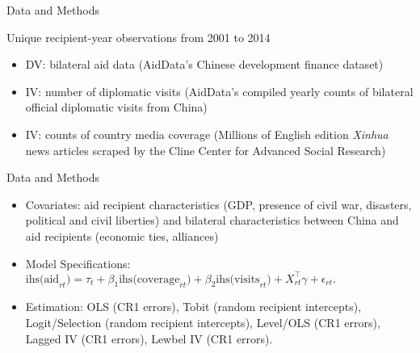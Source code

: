 \documentclass{beamer}
\begin{document}


\begin{frame}{Data and Methods}

Unique recipient-year observations from 2001 to 2014

\begin{itemize} 

\item DV: bilateral aid data (AidData’s Chinese development finance dataset)

\item IV: number of diplomatic visits (AidData’s compiled yearly counts of bilateral official
diplomatic visits from China)

\item IV: counts of country media coverage (Millions of English edition \textit{Xinhua} news articles scraped by the Cline Center for Advanced Social Research)


\end{itemize}

\end{frame}


\begin{frame}{Data and Methods}

\begin{itemize} 

\item Covariates: aid recipient characteristics (GDP, presence of civil war, disasters, political and civil liberties) and bilateral characteristics between China and aid recipients (economic ties, alliances)

\item Model Specifications: $\text{ihs(aid}_{rt}) = \tau_t + \beta_1\text{ihs(coverage}_{rt}) + \beta_2\text{ihs(visits}_{rt}) + X_{rt}^\top \gamma + \epsilon_{rt}.$

\item Estimation: OLS (CR1 errors), Tobit (random recipient intercepts), Logit/Selection (random recipient intercepts), Level/OLS (CR1 errors), Lagged IV (CR1 errors), Lewbel IV (CR1 errors).

\end{itemize}

\end{frame}

\end{document}
